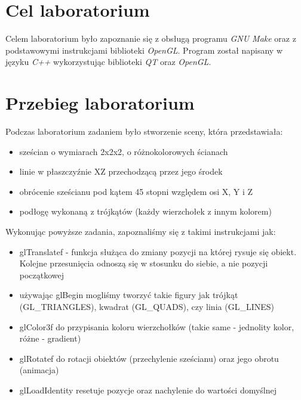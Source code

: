 \documentclass{article}
\begin{document}

\newpage
\section{Cel laboratorium}
Celem laboratorium było zapoznanie się z obsługą programu \emph{GNU Make} oraz z podstawowymi instrukcjami \newline biblioteki \emph{OpenGL}. Program został napisany w języku \emph{C++} wykorzystując biblioteki \emph{QT} oraz \emph{OpenGL}.
\section{Przebieg laboratorium}
Podczas laboratorium zadaniem było stworzenie sceny, która przedstawiała:
\begin{itemize}
\item sześcian o wymiarach 2x2x2, o różnokolorowych ścianach
\item linie w płaszczyźnie XZ przechodzącą przez jego środek
\item obrócenie sześcianu pod kątem 45 stopni względem osi X, Y i Z
\item podłogę wykonaną z trójkątów (każdy wierzchołek z innym kolorem)
\end{itemize}
Wykonując powyższe zadania, zapoznaliśmy się z takimi instrukcjami jak:
\begin{itemize}
\item \textsf{glTranslatef} - funkcja służąca do zmiany pozycji na której rysuje się obiekt. Kolejne przesunięcia odnoszą się w stosunku do siebie, a nie pozycji początkowej
\item używając \textsf{glBegin} mogliśmy tworzyć takie figury jak trójkąt (\textsf{GL\_TRIANGLES}), kwadrat (\textsf{GL\_QUADS}), czy linia (\textsf{GL\_LINES})
\item \textsf{glColor3f} do przypisania koloru wierzchołków (takie same - jednolity kolor, różne - gradient)
\item \textsf{glRotatef} do rotacji obiektów (przechylenie sześcianu) oraz jego obrotu (animacja)
\item \textsf{glLoadIdentity} resetuje pozycje oraz nachylenie do wartości domyślnej
\end{itemize}
\end{document}
